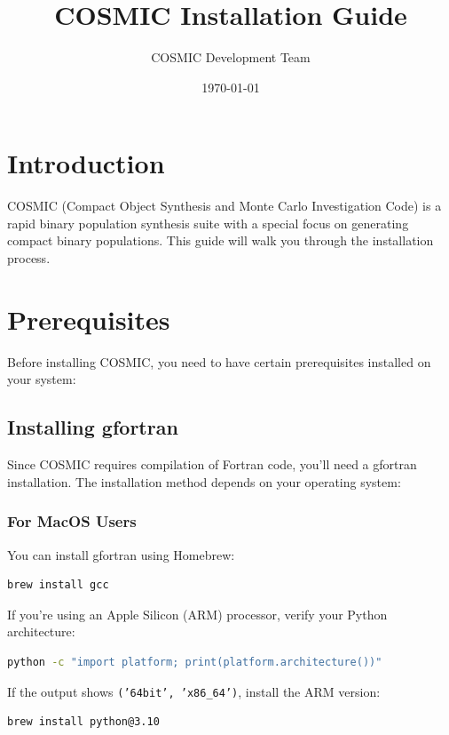 \documentclass[a4paper,11pt]{article}
\begin{document}
\title{COSMIC Installation Guide}
\author{COSMIC Development Team}
\date{\today}

\maketitle

\section{Introduction}
COSMIC (Compact Object Synthesis and Monte Carlo Investigation Code) is a rapid binary population synthesis suite with a special focus on generating compact binary populations. This guide will walk you through the installation process.

\section{Prerequisites}
Before installing COSMIC, you need to have certain prerequisites installed on your system:

\subsection{Installing gfortran}
Since COSMIC requires compilation of Fortran code, you'll need a gfortran installation. The installation method depends on your operating system:

\subsubsection{For MacOS Users}
You can install gfortran using Homebrew:
\begin{lstlisting}[language=bash]
brew install gcc
\end{lstlisting}

\begin{tcolorbox}[title=Note for Apple Silicon Users]
If you're using an Apple Silicon (ARM) processor, verify your Python architecture:
\begin{lstlisting}[language=bash]
python -c "import platform; print(platform.architecture())"
\end{lstlisting}
If the output shows \texttt{('64bit', 'x86\_64')}, install the ARM version:
\begin{lstlisting}[language=bash]
brew install python@3.10
\end{lstlisting}
\end{tcolorbox}
\end{document}
